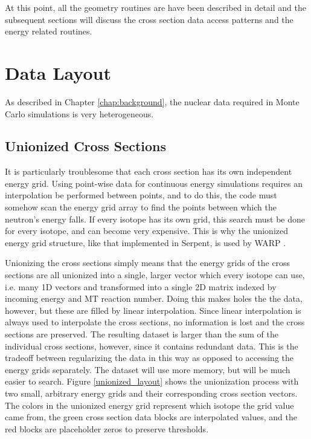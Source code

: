 At this point, all the geometry routines are have been described in detail and the subsequent sections will discuss the cross section data access patterns and the energy related routines.


\section{Data Layout}

As described in Chapter \ref{chap:background}, the nuclear data required in Monte Carlo simulations is very heterogeneous.

\subsection{Unionized Cross Sections}

It is particularly troublesome that each cross section has its own independent energy grid.  Using point-wise data for continuous energy simulations requires an interpolation be performed between points, and to do this, the code must somehow scan the energy grid array to find the points between which the neutron's energy falls.  If every isotope has its own grid, this search must be done for every isotope, and can become very expensive.  This is why the unionized energy grid structure, like that implemented in Serpent, is used by WARP \cite{jaakko_xs}.

Unionizing the cross sections simply means that the energy grids of the cross sections are all unionized into a single, larger vector which every isotope can use, i.e. many 1D vectors and transformed into a single 2D matrix indexed by incoming energy and MT reaction number.  Doing this makes holes the the data, however, but these are filled by linear interpolation.  Since linear interpolation is always used to interpolate the cross sections, no information is lost and the cross sections are preserved.  The resulting dataset is larger than the sum of the individual cross sections, however, since it contains redundant data.  This is the tradeoff between regularizing the data in this way as opposed to accessing the energy grids separately.  The dataset will use more memory, but will be much easier to search.  Figure \ref{unionized_layout} shows the unionization process with two small, arbitrary energy grids and their corresponding cross section vectors.  The colors in the unionized energy grid represent which isotope the grid value came from, the green cross section data blocks are interpolated values, and the red blocks are placeholder zeros to preserve thresholds.

